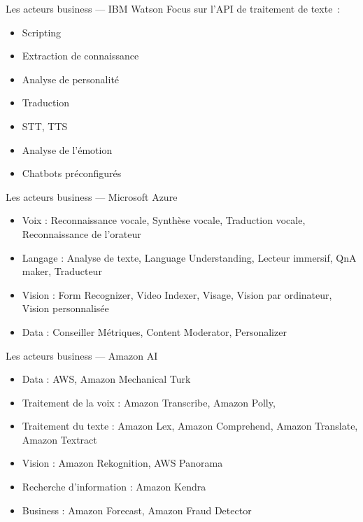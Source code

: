 \begin{frame}{Les acteurs business --- IBM Watson}
  Focus sur l'API de traitement de texte~:
  \begin{minipage}[c]{0.49\linewidth}
    \begin{itemize}
    \item Scripting
    \item Extraction de connaissance
    \item Analyse de personalité
    \item Traduction
    \end{itemize}
  \end{minipage}\hfill
  \begin{minipage}[c]{0.50\linewidth}
    \begin{itemize}
    \item STT, TTS
    \item Analyse de l'émotion
    \item Chatbots préconfigurés
    \end{itemize}
  \end{minipage}\hfill
\end{frame}

\begin{frame}{Les acteurs business --- Microsoft Azure}
  \begin{itemize}
    \item Voix : Reconnaissance vocale, Synthèse vocale, Traduction vocale, Reconnaissance de l'orateur
    \item Langage : Analyse de texte, Language Understanding, Lecteur immersif, QnA maker, Traducteur
    \item Vision : Form Recognizer, Video Indexer, Visage, Vision par ordinateur, Vision personnalisée
    \item Data : Conseiller Métriques, Content Moderator, Personalizer
  \end{itemize}
\end{frame}

\begin{frame}{Les acteurs business --- Amazon AI}
  \begin{itemize}
    \item Data : AWS, Amazon Mechanical Turk
    \item Traitement de la voix : Amazon Transcribe, Amazon Polly, 
    \item Traitement du texte : Amazon Lex, Amazon Comprehend, Amazon Translate, Amazon Textract
    \item Vision : Amazon Rekognition, AWS Panorama
    \item Recherche d'information : Amazon Kendra
    \item Business : Amazon Forecast, Amazon Fraud Detector
  \end{itemize}
\end{frame}

